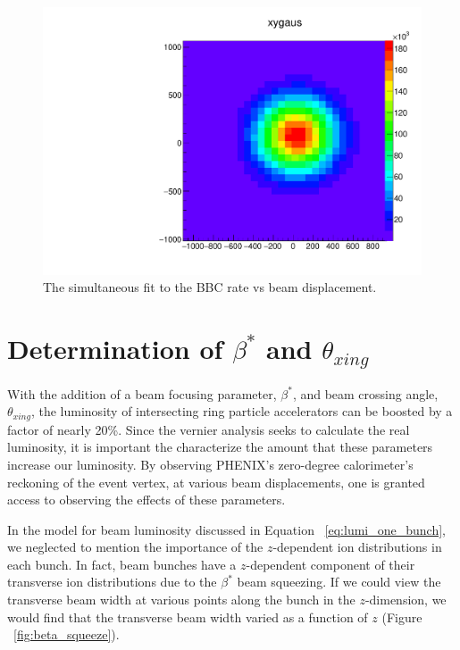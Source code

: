 \begin{figure}
  \centering
  \includegraphics[width=0.8\linewidth]{./figures/beam_width_359711.pdf}
  \caption{
    The simultaneous fit to the BBC rate vs beam displacement.
  }
  \label{fig:width_true}
\end{figure}

\section{Determination of $\beta^*$ and $\theta_{xing}$}
\label{sec:hourglass_correction}

With the addition of a beam focusing parameter, $\beta^*$, and beam crossing
angle, $\theta_{xing}$, the luminosity of intersecting ring particle
accelerators can be boosted by a factor of nearly 20\%. Since the vernier
analysis seeks to calculate the real luminosity, it is important the
characterize the amount that these parameters increase our luminosity. By
observing PHENIX's zero-degree calorimeter's reckoning of the event vertex, at
various beam displacements, one is granted access to observing the effects of
these parameters.

In the model for beam luminosity discussed in Equation ~\ref{eq:lumi_one_bunch},
we neglected to  mention the importance of the $z$-dependent ion distributions
in each bunch. In fact, beam bunches have a $z$-dependent component of their
transverse ion distributions due to the $\beta^*$ beam squeezing. If we could
view the transverse beam width at various points along the bunch in the
$z$-dimension, we would find that the transverse beam width varied as a function
of $z$ (Figure ~\ref{fig:beta_squeeze}).

